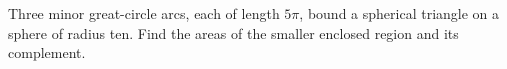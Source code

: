 Three minor great-circle arcs, each of length $5\pi$, bound a spherical triangle on a sphere of radius ten. Find the areas of the smaller enclosed region and its complement.
